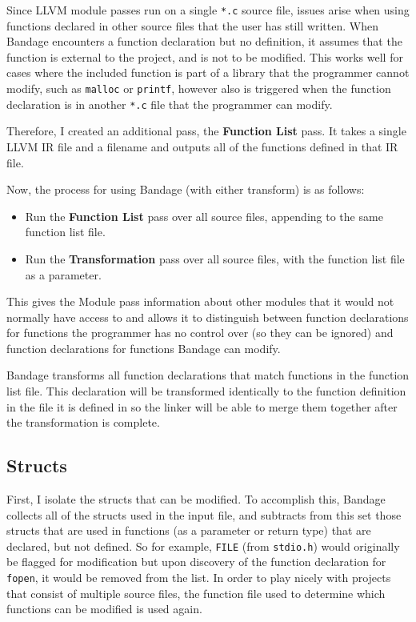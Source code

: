 Since LLVM module passes run on a single \verb!*.c! source file, issues arise when using functions declared in other source files that the user has still written.
When Bandage encounters a function declaration but no definition, it assumes that the function is external to the project, and is not to be modified.
This works well for cases where the included function is part of a library that the programmer cannot modify, such as \verb!malloc! or \verb!printf!, however also is triggered when the function declaration is in another \verb!*.c! file that the programmer can modify.

Therefore, I created an additional pass, the \textbf{Function List} pass.
It takes a single LLVM IR file and a filename and outputs all of the functions defined in that IR file.

Now, the process for using Bandage (with either transform) is as follows:
\begin{itemize}
\item Run the \textbf{Function List} pass over all source files, appending to the same function list file.
\item Run the \textbf{Transformation} pass over all source files, with the function list file as a parameter.
\end{itemize}

This gives the Module pass information about other modules that it would not normally have access to and allows it to distinguish between function declarations for functions the programmer has no control over (so they can be ignored) and function declarations for functions Bandage can modify.

Bandage transforms all function declarations that match functions in the function list file.
This declaration will be transformed identically to the function definition in the file it is defined in so the linker will be able to merge them together after the transformation is complete.


\subsection{Structs}

First, I isolate the structs that can be modified.
To accomplish this, Bandage collects all of the structs used in the input file, and subtracts from this set those structs that are used in functions (as a parameter or return type) that are declared, but not defined.
So for example, \verb!FILE! (from \verb!stdio.h!) would originally be flagged for modification but upon discovery of the function declaration for \verb!fopen!, it would be removed from the list.
In order to play nicely with projects that consist of multiple source files, the function file used to determine which functions can be modified is used again.

